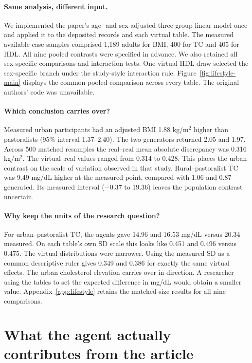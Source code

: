 \documentclass[sigconf,anonymous,review]{acmart}
\begin{document}
\paragraph{Same analysis, different input.}
We implemented the paper's age- and sex-adjusted three-group linear model once and applied it to the deposited records and each virtual table. The measured available-case samples comprised 1,189 adults for BMI, 400 for TC and 405 for HDL. All nine pooled contrasts were specified in advance. We also retained all sex-specific comparisons and interaction tests. One virtual HDL draw selected the sex-specific branch under the study-style interaction rule. Figure~\ref{fig:lifestyle-main} displays the common pooled comparison across every table. The original authors' code was unavailable.

\paragraph{Which conclusion carries over?}
Measured urban participants had an adjusted BMI 1.88 kg/m$^2$ higher than pastoralists (95\% interval 1.37--2.40). The two generators returned 2.05 and 1.97. Across 500 matched resamples the real--real mean absolute discrepancy was 0.316 kg/m$^2$. The virtual--real values ranged from 0.314 to 0.428. This places the urban contrast on the scale of variation observed in that study. Rural--pastoralist TC was 9.49 mg/dL higher at the measured point, compared with 1.06 and 0.87 generated. Its measured interval ($-0.37$ to 19.36) leaves the population contrast uncertain.

\paragraph{Why keep the units of the research question?}
For urban--pastoralist TC, the agents gave 14.96 and 16.53 mg/dL versus 20.34 measured. On each table's own SD scale this looks like 0.451 and 0.496 versus 0.475. The virtual distributions were narrower. Using the measured SD as a common descriptive ruler gives 0.349 and 0.386 for exactly the same virtual effects. The urban cholesterol elevation carries over in direction. A researcher using the tables to set the expected difference in mg/dL would obtain a smaller value. Appendix~\ref{app:lifestyle} retains the matched-size results for all nine comparisons.

\section{What the agent actually contributes from the article}
\label{sec:original}
\end{document}
